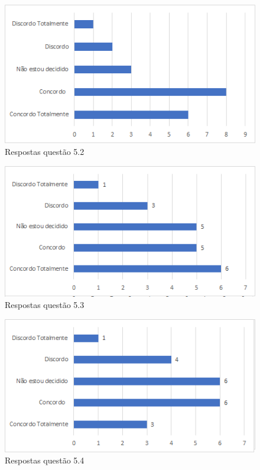 \begin{figure}[!t]
\centering
\includegraphics[scale=0.7]{figuras das questoes/5.2.png}
\caption{Respostas questão 5.2}
\end{figure}

\begin{figure}[!t]
\centering
\includegraphics[scale=0.7]{figuras das questoes/5.3.png}
\caption{Respostas questão 5.3}
\end{figure}

\begin{figure}[!t]
\centering
\includegraphics[scale=0.7]{figuras das questoes/5.4.png}
\caption{Respostas questão 5.4}
\end{figure}
 
